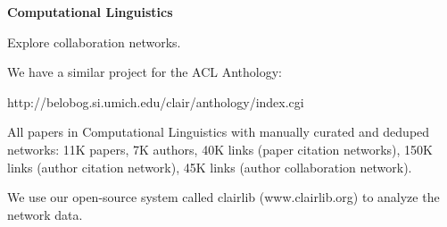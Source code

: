   \textbf{Computational Linguistics}

  Explore collaboration networks.

We have a similar project for the ACL Anthology:

http://belobog.si.umich.edu/clair/anthology/index.cgi

All papers in Computational Linguistics with manually curated and
deduped networks: 11K papers, 7K authors, 40K links (paper citation
networks), 150K links (author citation network), 45K links (author
collaboration network).

We use our open-source system called clairlib (www.clairlib.org) to
analyze the network data.



